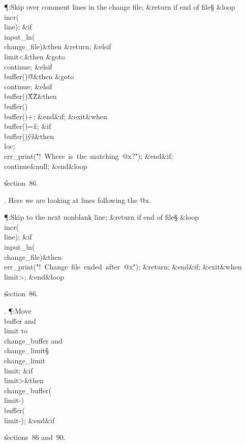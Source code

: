 \Y\P\?\4:Skip over comment lines in the change file; \&{return} if end of
file\X\S\?\6
\1\&{loop}\6
\\{incr}\?\1(\?\\{line}\?\2)\?;\6
\&{if}\1\1\?\8\R\?\\{input\_ln}\?\1(\?\\{change\_file}\?\2)\?\2\8\&{then}\6
\&{return};\6
\4\&{elsif}\1\8\\{limit}\?<\2\8\&{then}\6
\&{goto}\8\\{continue};\6
\4\&{elsif}\1\8\\{buffer}\?\1(\?\2)\I\?\H{@}\2\8\&{then}\6
\&{goto}\8\\{continue};\6
\4\&{elsif}\1\8\\{buffer}\?\1(\?\2)\in\?\H{X}\?\to\?\H{Z}\2\8\&{then}\6
\\{buffer}\?\1(\?\2)\K\?\\{buffer}\?\1(\?\2)+\?;%
\2\6
\&{end}\8\2\&{if}\1;\6
\?\&{exit}\8\&{when}\?\8\\{buffer}\?\1(\?\2)=\?\H{x};\6
\&{if}\1\1\8\\{buffer}\?\1(\?\2)\in\?\H{y}\?\to\?\H{z}\2\8\&{then}\6
\\{loc}\?\K{};\5
\\{err\_print}\?\1(\?\.{"!\ Where\ is\ the\ matching\ @x?"}\?\2)\?;\2\6
\&{end}\8\2\&{if}\1;\6
\4\BL\\{continue}\EL\8\&{null};\2\6
\&{end}\8\&{loop}\par
\U section~86.\fi

. Here we are looking at lines following the \.{@x}.

\Y\P\?\4:Skip to the next nonblank line; \&{return} if end of file\X\S\?\6
\1\&{loop}\6
\\{incr}\?\1(\?\\{line}\?\2)\?;\6
\&{if}\1\1\?\8\R\?\\{input\_ln}\?\1(\?\\{change\_file}\?\2)\?\2\8\&{then}\6
\\{err\_print}\?\1(\?\.{"!\ Change\ file\ ended\ after\ @x"}\?\2)\?;\6
\&{return};\2\6
\&{end}\8\2\&{if}\1;\6
\?\&{exit}\8\&{when}\?\8\\{limit}\?>;\2\6
\&{end}\8\&{loop}\par
\U section~86.\fi

. \P\?:Move \\{buffer} and \\{limit} to \\{change\_buffer} and %
\\{change\_limit}\X\S\?\6
\\{change\_limit}\?\K\?\\{limit};\6
\&{if}\1\1\8\\{limit}\?>\2\8\&{then}\6
\\{change\_buffer}\?\1(\?\to\?\\{limit}\?-\?\2)\K\?\\{buffer}\?\1(\?%
\to\?\\{limit}\?-\?\2)\?;\2\6
\&{end}\8\2\&{if}\1\par
\U sections~86 and~90.\fi

